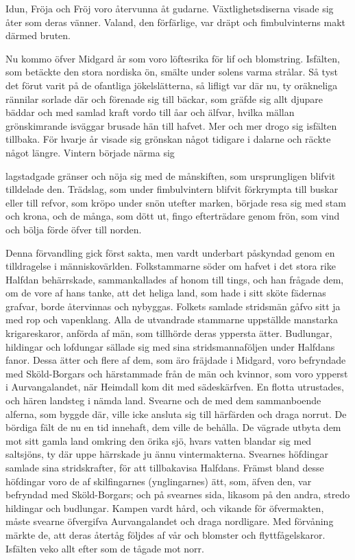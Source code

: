 Idun, Fröja och Fröj voro återvunna åt gudarne. Växtlighetsdiserna
visade sig åter som deras vänner. Valand, den förfärlige, var dräpt och
fimbulvinterns makt därmed bruten.



Nu kommo öfver Midgard år som voro löftesrika för lif och blomstring.
Isfälten, som betäckte den stora nordiska ön, smälte under solens varma
strålar. Så tyst det förut varit på de ofantliga jökelslätterna, så
lifligt var där nu, ty oräkneliga rännilar sorlade där och förenade sig
till bäckar, som gräfde sig allt djupare bäddar och med samlad kraft
vordo till åar och älfvar, hvilka mällan grönskimrande isväggar brusade
hän till hafvet. Mer och mer drogo sig isfälten tillbaka. För hvarje år
visade sig grönskan något tidigare i dalarne och räckte något längre.
Vintern började närma sig

lagstadgade gränser och nöja sig med de månskiften, som ursprungligen
blifvit tilldelade den. Trädslag, som under fimbulvintern blifvit
förkrympta till buskar eller till refvor, som kröpo under snön utefter
marken, började resa sig med stam och krona, och de många, som dött ut,
fingo efterträdare genom frön, som vind och bölja förde öfver till
norden.

Denna förvandling gick först sakta, men vardt underbart påskyndad genom
en tilldragelse i människovärlden. Folkstammarne söder om hafvet i det
stora rike Halfdan behärrskade, sammankallades af honom till tings, och
han frågade dem, om de vore af hans tanke, att det heliga land, som hade
i sitt sköte fädernas grafvar, borde återvinnas och nybyggas. Folkets
samlade stridsmän gåfvo sitt ja med rop och vapenklang. Alla de
utvandrade stammarne uppställde manstarka krigareskaror, anförda af män,
som tillhörde deras yppersta ätter. Budlungar, hildingar och lofdungar
sällade sig med sina stridsmannaföljen under Halfdans fanor. Dessa ätter
och flere af dem, som äro fräjdade i Midgard, voro befryndade med
Sköld-Borgars och härstammade från de män och kvinnor, som voro ypperst
i Aurvangalandet, när Heimdall kom dit med sädeskärfven. En flotta
utrustades, och hären landsteg i nämda land. Svearne och de med dem
sammanboende alferna, som byggde där, ville icke ansluta sig till
härfärden och draga norrut. De bördiga fält de nu en tid innehaft, dem
ville de behålla. De vägrade utbyta dem mot sitt gamla land omkring den
örika sjö, hvars vatten blandar sig med saltsjöns, ty där uppe härrskade
ju ännu vintermakterna. Svearnes höfdingar samlade sina stridskrafter,
för att tillbakavisa Halfdans. Främst bland desse höfdingar voro de af
skilfingarnes (ynglingarnes) ätt, som, äfven den, var befryndad med
Sköld-Borgars; och på svearnes sida, likasom på den andra, stredo
hildingar och budlungar. Kampen vardt hård, och vikande för öfvermakten,
måste svearne öfvergifva Aurvangalandet och draga nordligare. Med
förvåning märkte de, att deras återtåg följdes af vår och blomster och
flyttfågelskaror. Isfälten veko allt efter som de tågade mot norr.

